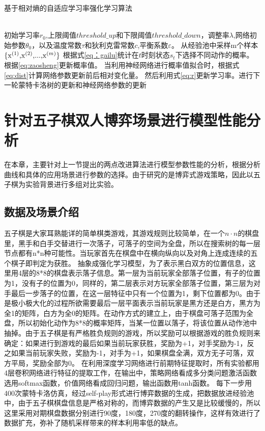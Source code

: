 \begin{algorithm}[!htpb]
	\caption{基于相对熵的自适应学习率强化学习算法}%
	\begin{algorithmic}[1]
		\Require ~~ \\
		初始学习率$r_0$,上限阈值$threshold\_up$和下限阈值$threshold\_down$，调整率$\lambda$,网络初始参数$\theta_0$，以及温度常数$\tau$和狄利克雷常数$c$,平衡系数$\varepsilon $。
		\State 从经验池中采样m个样本${\rm{\{ }}{{\rm{x}}^{(1)}}{\rm{,}}{{\rm{x}}^{(2)}}{\rm{,}}...{\rm{,}}{{\rm{x}}^{(m)}}{\rm{\} }}$
		\State 根据式\ref{eq：gailu}统计在$t$时刻状态$s_t$下选择不同动作的概率。
		\State 根据\ref{eq:zaosheng}更新概率值。
		\State 当利用神经网络进行概率值拟合时，根据式\ref{eq:dist}计算网络参数更新前后相对变化量。
		\State 然后利用式\ref{eq:r}更新学习率。进行下一轮蒙特卡洛树的更新和神经网络参数的更新
		\EndWhile
	\end{algorithmic}
\end{algorithm}
\section{针对五子棋双人博弈场景进行模型性能分析}
在本章，主要针对上一节提出的两点改进算法进行模型参数性能的分析，根据分析曲线和具体的应用场景进行参数的选择。由于研究的是博弈式游戏策略，因此以五子棋为实验背景进行多组对比实验。

\subsection{数据及场景介绍}
五子棋是大家耳熟能详的简单棋类游戏，其游戏规则比较简单，在一个$n\cdot n$的棋盘里，黑手和白手交替进行一次落子，可落子的空间为全盘，所以在搜索树的每一层节点都有n*n种可能性。当玩家首先在棋盘中在横向纵向以及对角上连成连续的五个棋子即判定为获胜。
抽象成强化学习模型，为了表示黑白双方的位置信息，这里用4层的8*8的棋盘表示落子信息。第一层为当前玩家全部落子位置，有子的位置为1，没有子的位置为0，同样的，第二层表示对方玩家全部落子位置，第三层为对手最后一步落子的位置，在这一层特征中只有一个位置为1，剩下位置都为0。由于是极小极大化的过程所欲需要最后一层平面表示当前玩家是黑方还是白方，黑方为全1的矩阵，白方为全0的矩阵。在动作方式的建立上，由于棋盘可落子范围为全盘，所以初始化动作为8*8的概率矩阵，当某一位置以落子，将该位置从动作池中抽掉。由于五子棋是有严格胜负规则的游戏，所以奖励可以根据游戏的胜负规则来确定：如果进行到游戏的最后如果当前玩家获胜，奖励为+1，对手奖励为-1，反之如果当前玩家失败，奖励为-1，对手为+1，如果棋盘全满，双方无子可落，双方平局，奖励全部为0。
在利用深度学习网络进行前期特征提取时，所有实验都用4层卷积网络进行特征的提取工作，在输出中，策略网络看成多分类问题激活函数选用softmax函数，价值网络看成回归问题，输出函数用tanh函数。
每下一步用400次蒙特卡洛仿真，经过self-play形式进行博弈数据的生成，把数据放进经验池中，由于五子棋棋盘信息是严格对称的，而博弈数据的产生又是比较缓慢的，所以这里采用对期棋盘数据分别进行90度，180度，270度的翻转操作，这样有效进行了数据扩充，弥补了随机采样带来的样本利用率低的缺点。
